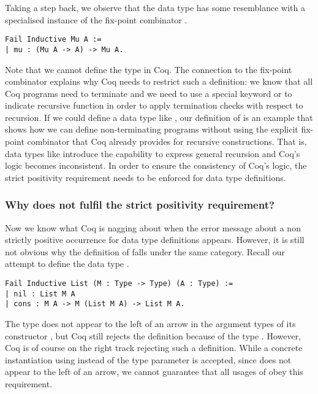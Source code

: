 Taking a step back, we observe that the data type  has some resemblance with a specialised instance
of the fix-point combinator .

\begin{verbatim}
Fail Inductive Mu A :=
| mu : (Mu A -> A) -> Mu A.
\end{verbatim}

Note that we cannot define the type  in Coq.
The connection to the fix-point combinator explains why Coq needs to restrict such a definition: we know that all Coq programs need to terminate and we need to use a special keyword  or  to indicate recursive function in order to apply termination checks with respect to recursion.
If we could define a data type like , our definition of  is an example that shows how we can define non-terminating programs without using the explicit fix-point combinator that Coq already provides for recursive constructions.
That is, data types like  introduce the capability to express general recursion and Coq's logic becomes inconsistent.
In order to ensure the consistency of Coq's logic, the strict positivity requirement needs to be enforced for data type definitions.

\subsubsection{Why does  not fulfil the strict positivity requirement?}

Now we know what Coq is nagging about when the error message about a non strictly positive occurrence for data type definitions appears.
However, it is still not obvious why the definition of  falls under the same category.
Recall our attempt to define the data type .

\begin{verbatim}
Fail Inductive List (M : Type -> Type) (A : Type) :=
| nil : List M A
| cons : M A -> M (List M A) -> List M A.
\end{verbatim}

The type  does not appear to the left of an arrow in the argument types of its constructor , but Coq still rejects the definition because of the type .
However, Coq is of course on the right track rejecting such a definition.
While a concrete instantiation using  instead of the type parameter  is accepted, since  does not appear to the left of an arrow, we cannot guarantee that all usages of  obey this requirement.

